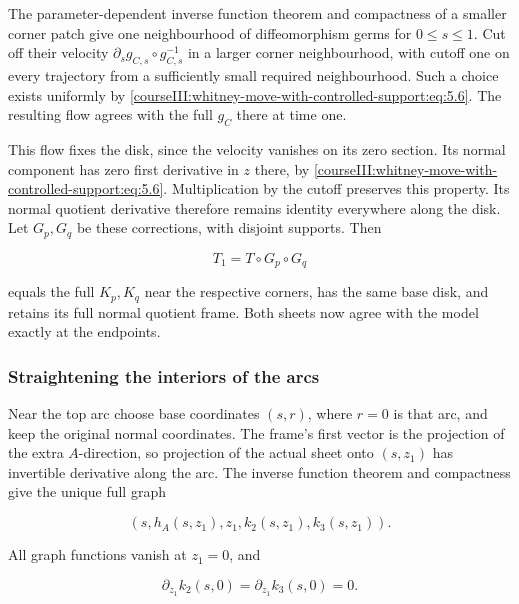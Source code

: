 The parameter-dependent inverse function theorem and compactness of a smaller corner patch give one neighbourhood of diffeomorphism germs for \(0\leq s\leq1\). Cut off their velocity \(\partial_sg_{C,s}\circ g_{C,s}^{-1}\) in a larger corner neighbourhood, with cutoff one on every trajectory from a sufficiently small required neighbourhood. Such a choice exists uniformly by \eqref{courseIII:whitney-move-with-controlled-support:eq:5.6}. The resulting flow agrees with the full \(g_C\) there at time one.

This flow fixes the disk, since the velocity vanishes on its zero section. Its normal component has zero first derivative in \(z\) there, by \eqref{courseIII:whitney-move-with-controlled-support:eq:5.6}. Multiplication by the cutoff preserves this property. Its normal quotient derivative therefore remains identity everywhere along the disk. Let \(G_p,G_q\) be these corrections, with disjoint supports. Then

\begin{equation}
T_1=T\circ G_p\circ G_q
\label{courseIII:whitney-move-with-controlled-support:eq:5.8}
\end{equation}

equals the full \(K_p,K_q\) near the respective corners, has the same base disk, and retains its full normal quotient frame. Both sheets now agree with the model exactly at the endpoints.

\subsubsection{Straightening the interiors of the arcs}
\label{courseIII:whitney-move-with-controlled-support:section-5.3}

Near the top arc choose base coordinates \((s,r)\), where \(r=0\) is that arc, and keep the original normal coordinates. The frame's first vector is the projection of the extra \(A\)-direction, so projection of the actual sheet onto \((s,z_1)\) has invertible derivative along the arc. The inverse function theorem and compactness give the unique full graph

\begin{equation}
(s,h_A(s,z_1),z_1,k_2(s,z_1),k_3(s,z_1)).
\label{courseIII:whitney-move-with-controlled-support:eq:5.9}
\end{equation}

All graph functions vanish at \(z_1=0\), and

\begin{equation}
\partial_{z_1}k_2(s,0)=\partial_{z_1}k_3(s,0)=0.
\label{courseIII:whitney-move-with-controlled-support:eq:5.10}
\end{equation}

